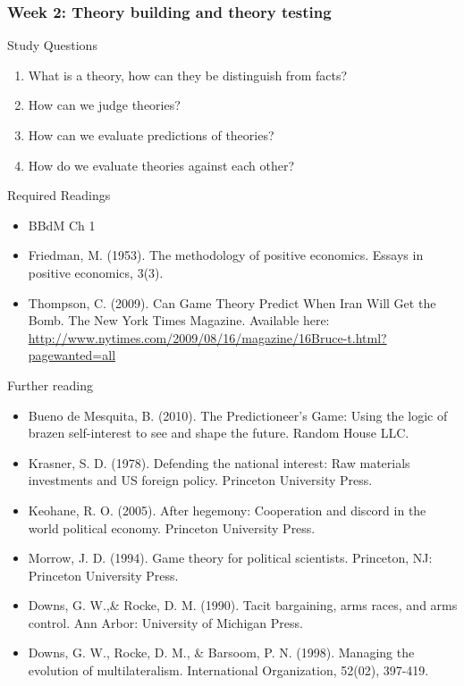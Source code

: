 \documentclass[12pt,a4paper]{article}
\begin{document}
\subsubsection*{Week 2: Theory building and theory testing}

Study Questions

\begin{enumerate}
	\item What is a theory, how can they be distinguish from facts? 
	\item How can we judge theories? 
	\item How can we evaluate predictions of theories? 
	\item How do we evaluate theories against each other? 
\end{enumerate}

\noindent Required Readings

\begin{itemize}
	\item BBdM Ch 1
	\item Friedman, M. (1953). The methodology of positive economics. Essays in positive economics, 3(3).
	\item Thompson, C. (2009). Can Game Theory Predict When Iran Will Get the Bomb. The New York Times Magazine. Available here: \url{http://www.nytimes.com/2009/08/16/magazine/16Bruce-t.html?pagewanted=all}
\end{itemize}

\noindent Further reading

\begin{itemize}
	\item Bueno de Mesquita, B. (2010). The Predictioneer's Game: Using the logic of brazen self-interest to see and shape the future. Random House LLC.
	\item Krasner, S. D. (1978). Defending the national interest: Raw materials investments and US foreign policy. Princeton University Press.
	\item Keohane, R. O. (2005). After hegemony: Cooperation and discord in the world political economy. Princeton University Press.
	\item Morrow, J. D. (1994). Game theory for political scientists. Princeton, NJ: Princeton University Press.
	\item Downs, G. W.,\& Rocke, D. M. (1990). Tacit bargaining, arms races, and arms control. Ann Arbor: University of Michigan Press.
	\item Downs, G. W., Rocke, D. M., \& Barsoom, P. N. (1998). Managing the evolution of multilateralism. International Organization, 52(02), 397-419.
	
\end{itemize}
\end{document}
